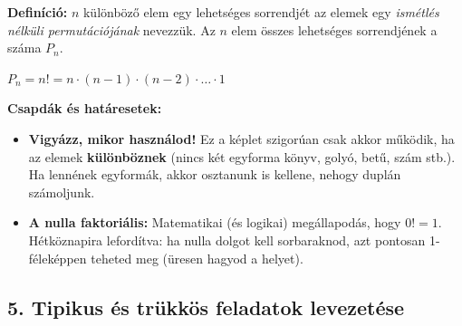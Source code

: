 \documentclass[11pt, a4paper]{article}
\begin{document}
\textbf{Definíció:} $n$ különböző elem egy lehetséges sorrendjét az elemek egy \emph{ismétlés nélküli permutációjának} nevezzük. Az $n$ elem összes lehetséges sorrendjének a száma $P_n$.

$P_n = n! = n \cdot (n - 1) \cdot (n - 2) \cdot \ldots \cdot 1$

\vspace{0.2cm}
\noindent\textbf{Csapdák és határesetek:}
\begin{itemize}
    \item \textbf{Vigyázz, mikor használod!} Ez a képlet szigorúan csak akkor működik, ha az elemek \textbf{különböznek} (nincs két egyforma könyv, golyó, betű, szám stb.). Ha lennének egyformák, akkor osztanunk is kellene, nehogy duplán számoljunk.
    \item \textbf{A nulla faktoriális:} Matematikai (és logikai) megállapodás, hogy $0! = 1$. Hétköznapira lefordítva: ha nulla dolgot kell sorbaraknod, azt pontosan 1-féleképpen teheted meg (üresen hagyod a helyet).
\end{itemize}

\vspace{0.5cm}
\noindent{}
\vspace{0.5cm}

\subsection*{5. Tipikus és trükkös feladatok levezetése}
\end{document}

